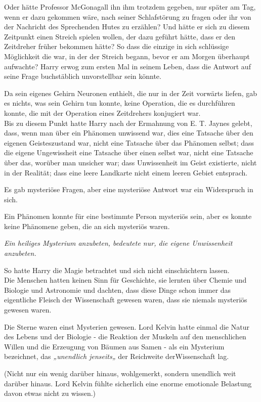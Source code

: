 {Oder hätte Professor McGonagall ihn ihm trotzdem gegeben, nur später am Tag, wenn er dazu gekommen wäre, nach seiner Schlafstörung zu fragen oder ihr von der Nachricht des Sprechenden Hutes zu erzählen? Und hätte er sich zu diesem Zeitpunkt einen Streich spielen wollen, der dazu geführt hätte, dass er den Zeitdreher früher bekommen hätte? So dass die einzige in sich schlüssige Möglichkeit die war, in der der Streich begann, bevor er am Morgen überhaupt aufwachte? Harry erwog zum ersten Mal in seinem Leben, dass die Antwort auf seine Frage buchstäblich unvorstellbar sein könnte.

Da sein eigenes Gehirn Neuronen enthielt, die nur in der Zeit vorwärts liefen, gab es nichts, was sein Gehirn tun konnte, keine Operation, die es durchführen konnte, die mit der Operation eines Zeitdrehers konjugiert war.\\ Bis zu diesem Punkt hatte Harry nach der Ermahnung von E. T. Jaynes gelebt, dass, wenn man über ein Phänomen unwissend war, dies eine Tatsache über den eigenen Geisteszustand war, nicht eine Tatsache über das Phänomen selbst; dass die eigene Ungewissheit eine Tatsache über einen selbst war, nicht eine Tatsache über das, worüber man unsicher war; dass Unwissenheit im Geist existierte, nicht in der Realität; dass eine leere Landkarte nicht einem leeren Gebiet entsprach.

Es gab mysteriöse Fragen, aber eine mysteriöse Antwort war ein Widerspruch in sich.

Ein Phänomen konnte für eine bestimmte Person mysteriös sein, aber es konnte keine Phänomene geben, die an sich mysteriös waren.

\emph{Ein heiliges Mysterium anzubeten, bedeutete nur, die eigene Unwissenheit anzubeten.}

So hatte Harry die Magie betrachtet und sich nicht einschüchtern lassen.\\ Die Menschen hatten keinen Sinn für Geschichte, sie lernten über Chemie und Biologie und Astronomie und dachten, dass diese Dinge schon immer das eigentliche Fleisch der Wissenschaft gewesen waren, dass sie niemals mysteriös gewesen waren.

Die Sterne waren einst Mysterien gewesen. Lord Kelvin hatte einmal die Natur des Lebens und der Biologie - die Reaktion der Muskeln auf den menschlichen Willen und die Erzeugung von Bäumen aus Samen - als ein Mysterium bezeichnet, das \emph{„unendlich jenseits„} der Reichweite derWissenschaft lag.

(Nicht nur ein wenig darüber hinaus, wohlgemerkt, sondern unendlich weit darüber hinaus. Lord Kelvin fühlte sicherlich eine enorme emotionale Belastung davon etwas nicht zu wissen.)

}
